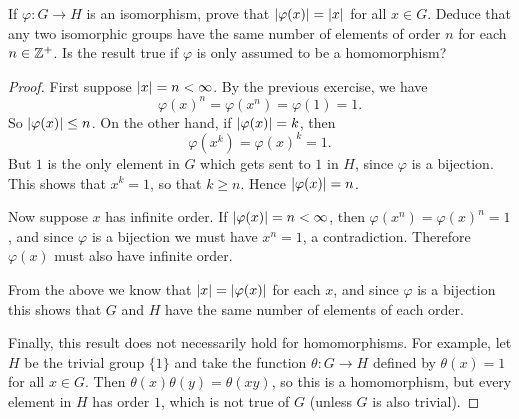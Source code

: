  If $\varphi\colon G\to H$ is an isomorphism, prove that
$\lvert{\varphi(x)}\rvert = \lvert{x}\rvert$ for all $x\in G$. Deduce that any two
isomorphic groups have the same number of elements of order $n$ for
each $n\in\mathbb{Z}^+$. Is the result true if $\varphi$ is only assumed to be
a homomorphism?
\begin{proof}
  First suppose $\lvert{x}\rvert = n<\infty$. By the previous exercise, we have
  \begin{equation*}
    \varphi(x)^n = \varphi(x^n) = \varphi(1) = 1.
  \end{equation*}
  So $\lvert{\varphi(x)}\rvert\leq n$. On the other hand, if
  $\lvert{\varphi(x)}\rvert = k$, then
  \begin{equation*}
    \varphi(x^k) = \varphi(x)^k = 1.
  \end{equation*}
  But $1$ is the only element in $G$ which gets sent to $1$ in $H$,
  since $\varphi$ is a bijection. This shows that $x^k = 1$, so that
  $k\geq n$. Hence $\lvert{\varphi(x)}\rvert = n$.

  Now suppose $x$ has infinite order. If
  $\lvert{\varphi(x)}\rvert = n < \infty$, then
  $\varphi(x^n) = \varphi(x)^n = 1$, and since $\varphi$ is a
  bijection we must have $x^n = 1$, a contradiction. Therefore
  $\varphi(x)$ must also have infinite order.

  From the above we know that $\lvert{x}\rvert = \lvert{\varphi(x)}\rvert$ for each
  $x$, and since $\varphi$ is a bijection this shows that $G$ and $H$
  have the same number of elements of each order.

  Finally, this result does not necessarily hold for
  homomorphisms. For example, let $H$ be the trivial group $\{1\}$ and
  take the function $\theta\colon G\to H$ defined by $\theta(x) = 1$
  for all $x\in G$. Then $\theta(x)\theta(y) = \theta(xy)$, so this is
  a homomorphism, but every element in $H$ has order $1$, which is not
  true of $G$ (unless $G$ is also trivial).
\end{proof}

